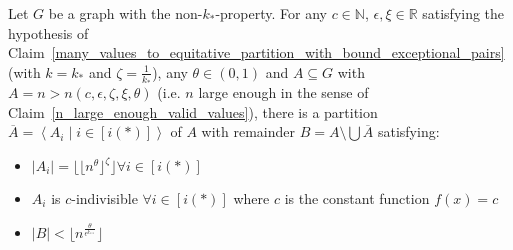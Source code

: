     \theorem[Theorem 4.23]
        Let $G$ be a graph with the non-$k_*$-property.
        For any $c \in \mathbb{N}$, $\epsilon, \xi \in \mathbb{R}$ satisfying the hypothesis of Claim~\ref{many_values_to_equitative_partition_with_bound_exceptional_pairs}
            (with $k = k_*$ and $\zeta = \frac{1}{k_*}$), any $\theta \in (0,1)$ and $A \subseteq G$ with
            $A = n > n\left( c, \epsilon, \zeta, \xi, \theta \right)$ (i.e. $n$ large enough in the sense of Claim~\ref{n_large_enough_valid_values}),
            there is a partition $\overline{A} = \left< A_i \mid i \in [i(*)] \right>$ of $A$ with remainder $B = A \setminus \bigcup \overline{A}$
            satisfying:
        \begin{itemize}
            \item $|A_i| = \lfloor \lfloor n^\theta \rfloor ^\zeta \rfloor \forall i \in [i(*)]$
            \item $A_i$ is $c$-indivisible $\forall i \in [i(*)]$ where $c$ is the constant function $f(x) = c$
            \item $|B| < \lfloor n^{\frac{\theta}{\epsilon^{k_{**}}}} \rfloor$
        \end{itemize}
